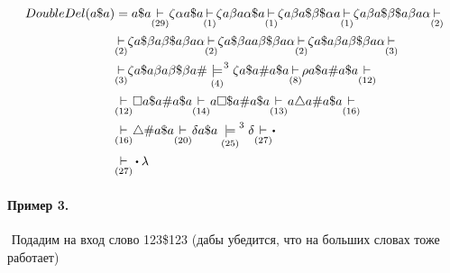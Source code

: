  \begin{align*}
     DoubleDel(a\$a) &= a\$a \underset{(29)}{\step} \zeta\alpha a\$a
     \underset{(1)}{\step} \zeta a\beta a\alpha\$a \underset{(1)}{\step}
     \zeta a\beta a \$\beta\$ \alpha a \underset{(1)}{\step}
     \zeta a\beta a \$\beta\$ a\beta a\alpha \underset{(2)}{\step}\\
                     &\underset{(2)}{\step} \zeta a\$\beta a\beta\$a\beta a\alpha \underset{(2)}{\step}
                     \zeta a\$\beta aa\beta\$\beta a\alpha \underset{(2)}{\step}
                     \zeta a\$a\beta a\beta\$\beta a\alpha \underset{(3)}{\step}\\
                     &\underset{(3)}{\step} \zeta a\$a\beta a\beta\$\beta a\#
                     \underset{(4)}{\models}^{3} \zeta a\$a\#a\$a
                     \underset{(8)}{\step} \rho a\$a\#a\$a \underset{(12)}{\step}\\
                     &\underset{(12)}{\step} \square a\$a\#a\$a \underset{(14)}{\step}
                     a\square\$a\#a\$a \underset{(13)}{\step}
                     a\triangle a\#a\$a \underset{(16)}{\step}\\
                     &\underset{(16)}{\step} \triangle\#a\$a \underset{(20)}{\step}
                     \delta a\$a \underset{(25)}{\models}^{3} \delta
                     \underset{(27)}{\step}\bigcdot\\
                     &\underset{(27)}{\step}\bigcdot \lambda
\end{align*}

\newpage

\paragraph*{Пример 3.} ${}$ \newline
Подадим на вход слово 123\$123 (дабы убедится, что на больших словах тоже работает)

